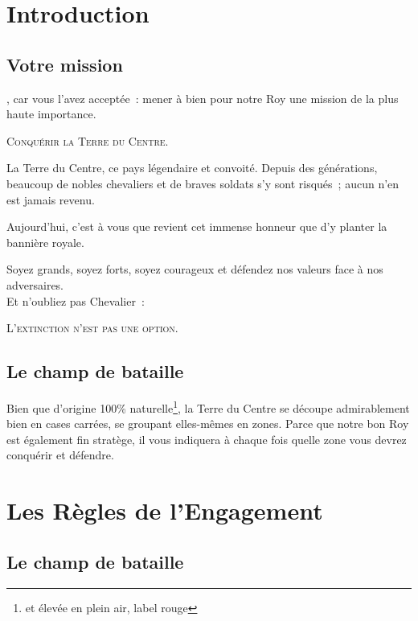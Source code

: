 \section{Introduction}

\newpage

\subsection{Votre mission}

, car vous l'avez acceptée~: mener à bien
pour notre Roy une mission de la plus haute importance.

\begin{center}
  {\large\textsc{Conquérir la Terre du Centre.}}
\end{center}

La Terre du Centre, ce pays légendaire et convoité. Depuis des
générations, beaucoup de nobles chevaliers et de braves soldats s'y sont
risqués~; aucun n'en est jamais revenu.

Aujourd'hui, c'est à vous que revient cet immense honneur que d'y
planter la bannière royale.

Soyez grands, soyez forts, soyez courageux et défendez nos valeurs
face à nos adversaires.\\

Et n'oubliez pas Chevalier~:

\begin{center}
  \textsc{L'extinction n'est pas une option.}
\end{center}

\subsection{Le champ de bataille}

Bien que d'origine 100\%{} naturelle\footnote{et élevée en plein air,
  label rouge}, la Terre du Centre se découpe admirablement bien en
cases carrées, se groupant elles-mêmes en zones. Parce que notre bon
Roy est également fin stratège, il vous indiquera à chaque fois quelle
zone vous devrez conquérir et défendre.
\newpage

\section{Les Règles de l'Engagement}

\subsection{Le champ de bataille}

